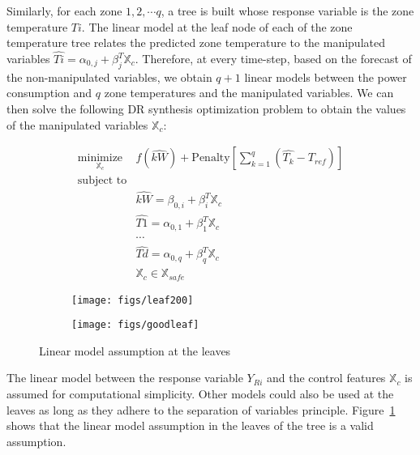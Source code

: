 \documentclass{sig-alternate-ipsn13}
\theoremstyle{definition}
\begin{document}
Similarly, for each zone $1,2,\cdots q$, a tree is built whose response variable is the zone temperature $Ti$. The linear model at the leaf node of each of the zone temperature tree relates the predicted zone temperature to the manipulated variables $\hat{Ti} = \alpha_{0,j} + \beta^T_j \mathbb{X}_c$.
Therefore, at every time-step, based on the forecast of the non-manipulated variables, we obtain $q+1$ linear models between the power consumption and $q$ zone temperatures and the manipulated variables. We can then solve the following DR synthesis optimization problem to obtain the values of the manipulated variables $\mathbb{X}_c$:
\begin{center}
\begin{equation}
\begin{aligned}
\underset{\mathbb{X}_c}{\text{minimize}}
 & f(\hat{kW})+\text{Penalty}[\sum_{k=1}^q(\hat{T_k}-T_{ref})] \\
\text{subject to} \\
& \hat{kW} = \beta_{0,i} + \beta^T_i \mathbb{X}_c \\
& \hat{T1} = \alpha_{0,1} + \beta^T_1 \mathbb{X}_c \\
& \cdots \\
& \hat{Td} = \alpha_{0,q} + \beta^T_q \mathbb{X}_c \\
& \mathbb{X}_c \in \mathbb{X}_{safe}
\end{aligned}
\label{eq:synth_program}
\end{equation}
\end{center}
\begin{figure}
  \begin{subfigure}
    \centering
  \texttt{[image: figs/leaf200]}
  \end{subfigure}  
  \begin{subfigure}
    \centering
  \texttt{[image: figs/goodleaf]}
  \end{subfigure}
  \caption{Linear model assumption at the leaves}
  \label{fig:leaf}
   \vspace{-5pt}
\end{figure}

The linear model between the response variable $Y_{Ri}$ and the control features $\mathbb{X}_c$ is assumed for computational simplicity. Other models could also be used at the leaves as long as they adhere to the separation of variables principle. Figure~\ref{fig:leaf} shows that the linear model assumption in the leaves of the tree is a valid assumption.
\end{document}
